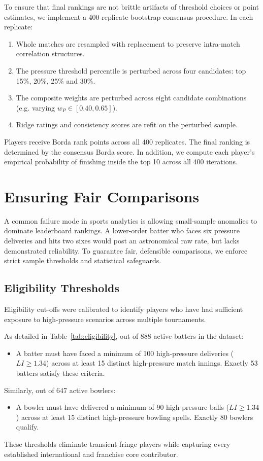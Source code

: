 \documentclass[11pt,a4paper]{article}
\begin{document}
To ensure that final rankings are not brittle artifacts of threshold choices or point estimates, we implement a 400-replicate bootstrap consensus procedure. In each replicate:
\begin{enumerate}
    \item Whole matches are resampled with replacement to preserve intra-match correlation structures.
    \item The pressure threshold percentile is perturbed across four candidates: top 15\%, 20\%, 25\% and 30\%.
    \item The composite weights are perturbed across eight candidate combinations (e.g. varying $w_P \in [0.40, 0.65]$).
    \item Ridge ratings and consistency scores are refit on the perturbed sample.
\end{enumerate}
Players receive Borda rank points across all 400 replicates. The final ranking is determined by the consensus Borda score. In addition, we compute each player's empirical probability of finishing inside the top 10 across all 400 iterations.

\section{Ensuring Fair Comparisons}
\label{sec:fairness}

A common failure mode in sports analytics is allowing small-sample anomalies to dominate leaderboard rankings. A lower-order batter who faces six pressure deliveries and hits two sixes would post an astronomical raw rate, but lacks demonstrated reliability. To guarantee fair, defensible comparisons, we enforce strict sample thresholds and statistical safeguards.

\subsection{Eligibility Thresholds}
Eligibility cut-offs were calibrated to identify players who have had sufficient exposure to high-pressure scenarios across multiple tournaments.



As detailed in Table~\ref{tab:eligibility}, out of 888 active batters in the dataset:
\begin{itemize}
    \item A batter must have faced a minimum of 100 high-pressure deliveries ($LI \ge 1.34$) across at least 15 distinct high-pressure match innings. Exactly 53 batters satisfy these criteria.
\end{itemize}
Similarly, out of 647 active bowlers:
\begin{itemize}
    \item A bowler must have delivered a minimum of 90 high-pressure balls ($LI \ge 1.34$) across at least 15 distinct high-pressure bowling spells. Exactly 80 bowlers qualify.
\end{itemize}
These thresholds eliminate transient fringe players while capturing every established international and franchise core contributor.
\end{document}
